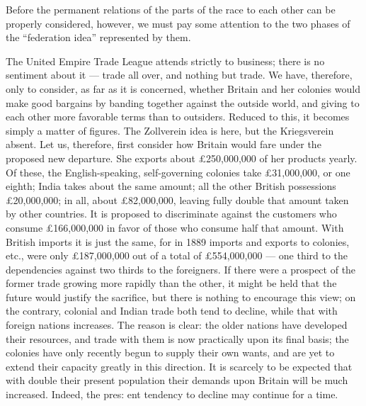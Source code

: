 \documentclass[11pt,openany]{book}
\begin{document}
Before the permanent relations of the parts of the race to each other can be properly considered, however, we must pay some attention to the two phases of the ``federation idea'' represented by them.

The United Empire Trade League attends strictly to business; there is no sentiment about it --- trade all over, and nothing but trade. We have, therefore, only to consider, as far as it is concerned, whether Britain and her colonies would make good bargains by banding together against the outside world, and giving to each other more favorable terms than to outsiders. Reduced to this, it becomes simply a matter of figures. The Zollverein idea is here, but the Kriegsverein absent. Let us, therefore, first consider how Britain would fare under the proposed new departure. She exports about £250,000,000 of her products yearly. Of these, the English-speaking, self-governing colonies take £31,000,000, or one eighth; India takes about the same amount; all the other British possessions £20,000,000; in all, about £82,000,000, leaving fully double that amount taken by other countries. It is proposed to discriminate against the customers who consume £166,000,000 in favor of those who consume half that amount. With British imports it is just the same, for in 1889 imports and exports to colonies, etc., were only £187,000,000 out of a total of £554,000,000 --- one third to the dependencies against two thirds to the foreigners. If there were a prospect of the former trade growing more rapidly than the other, it might be held that the future would justify the sacrifice, but there is nothing to encourage this view; on the contrary, colonial and Indian trade both tend to decline, while that with foreign nations increases. The reason is clear: the older nations have developed their resources, and trade with them is now practically upon its final basis; the colonies have only recently begun to supply their own wants, and are yet to extend their capacity greatly in this direction. It is scarcely to be expected that with double their present population their demands upon Britain will be much increased. Indeed, the pres: ent tendency to decline may continue for a time.
\end{document}
